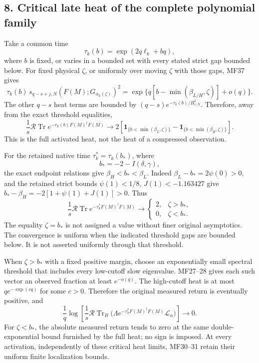 \documentclass[11pt]{article}
\begin{document}
\subsection{8. Critical late heat of the complete polynomial family}\label{critical-late-heat-of-the-complete-polynomial-family}

Take a common time \[
\tau_k(b)=\exp(2q\ell_k+bq),
\] where \(b\) is fixed, or varies in a bounded set with every stated strict gap bounded below. For fixed physical \(\zeta\), or uniformly over moving \(\zeta\) with those gaps, MF37 gives \[
\tau_k(b)\,s_{q-s+j,N}(F(M);G_{\alpha_k(\zeta)})^2
=\exp\{q[b-\min(\beta_{L/H},\zeta)]+o(q)\}.
\] The other \(q-s\) heat terms are bounded by \((q-s)e^{-\tau_k(b)/B_{s,N}^2}\). Therefore, away from the exact threshold equalities, \[
\frac1s\mathcal R\operatorname{Tr}
e^{-\tau_k(b)F(M)^\dagger F(M)}
\longrightarrow
2\left[\mathbf1_{\{b<\min(\beta_L,\zeta)\}}
-\mathbf1_{\{b<\min(\beta_H,\zeta)\}}\right].
\tag{MF39}
\] This is the full activated heat, not the heat of a compressed observation.

For the retained native time \(\tau_k^*=\tau_k(b_*)\), where \[
b_*=-2-I(\delta,\gamma),
\] the exact endpoint relations give \(\beta_H<b_*<\beta_L\). Indeed \(\beta_L-b_*=2\psi(0)>0\), and the retained strict bounds \(\psi(1)<1/8\), \(J(1)<-1.163427\) give \(b_*-\beta_H=-2[1+\psi(1)+J(1)]>0\). Thus \[
\frac1s\mathcal R\operatorname{Tr}
e^{-\tau_k^*F(M)^\dagger F(M)}
\longrightarrow
\begin{cases}
2,&\zeta>b_*,\\
0,&\zeta<b_*.
\end{cases}
\tag{MF40}
\] The equality \(\zeta=b_*\) is not assigned a value without finer original asymptotics. The convergence is uniform when the indicated threshold gaps are bounded below. It is not asserted uniformly through that threshold.

When \(\zeta>b_*\) with a fixed positive margin, choose an exponentially small spectral threshold that includes every low-cutoff slow eigenvalue. MF27--28 gives each such vector an observed fraction at least \(e^{-o(q)}\). The high-cutoff heat is at most \(q e^{-\exp(cq)}\) for some \(c>0\). Therefore the original measured return is eventually positive, and \[
\frac1q\log\left[
\frac1s\mathcal R\operatorname{Tr}_B
\bigl(\Lambda e^{-\tau_k^*F(M)^\dagger F(M)}\mathcal L_\alpha\bigr)
\right]\longrightarrow0.
\tag{MF41}
\] For \(\zeta<b_*\), the absolute measured return tends to zero at the same double-exponential bound furnished by the full heat; no sign is imposed. At every activation, independently of these critical heat limits, MF30--31 retain their uniform finite localization bounds.
\end{document}
